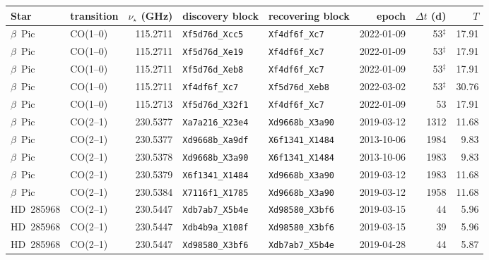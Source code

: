 \begin{tabular}{@{}llrllrrr@{}}
\hline
Star & transition & $\nu_\star$ (GHz) & discovery block & recovering block & epoch & $\Delta t$ (d) & $T$ \\
\hline
$\beta$~Pic & CO(1--0) & 115.2711 & \texttt{Xf5d76d\_Xcc5} & \texttt{Xf4df6f\_Xc7} & 2022-01-09 & 53$^\ddagger$ & 17.91 \\
$\beta$~Pic & CO(1--0) & 115.2711 & \texttt{Xf5d76d\_Xe19} & \texttt{Xf4df6f\_Xc7} & 2022-01-09 & 53$^\ddagger$ & 17.91 \\
$\beta$~Pic & CO(1--0) & 115.2711 & \texttt{Xf5d76d\_Xeb8} & \texttt{Xf4df6f\_Xc7} & 2022-01-09 & 53$^\ddagger$ & 17.91 \\
$\beta$~Pic & CO(1--0) & 115.2711 & \texttt{Xf4df6f\_Xc7} & \texttt{Xf5d76d\_Xeb8} & 2022-03-02 & 53$^\ddagger$ & 30.76 \\
$\beta$~Pic & CO(1--0) & 115.2713 & \texttt{Xf5d76d\_X32f1} & \texttt{Xf4df6f\_Xc7} & 2022-01-09 & 53 & 17.91 \\
$\beta$~Pic & CO(2--1) & 230.5377 & \texttt{Xa7a216\_X23e4} & \texttt{Xd9668b\_X3a90} & 2019-03-12 & 1312 & 11.68 \\
$\beta$~Pic & CO(2--1) & 230.5377 & \texttt{Xd9668b\_Xa9df} & \texttt{X6f1341\_X1484} & 2013-10-06 & 1984 & 9.83 \\
$\beta$~Pic & CO(2--1) & 230.5378 & \texttt{Xd9668b\_X3a90} & \texttt{X6f1341\_X1484} & 2013-10-06 & 1983 & 9.83 \\
$\beta$~Pic & CO(2--1) & 230.5379 & \texttt{X6f1341\_X1484} & \texttt{Xd9668b\_X3a90} & 2019-03-12 & 1983 & 11.68 \\
$\beta$~Pic & CO(2--1) & 230.5384 & \texttt{X7116f1\_X1785} & \texttt{Xd9668b\_X3a90} & 2019-03-12 & 1958 & 11.68 \\
HD~285968 & CO(2--1) & 230.5447 & \texttt{Xdb7ab7\_X5b4e} & \texttt{Xd98580\_X3bf6} & 2019-03-15 & 44 & 5.96 \\
HD~285968 & CO(2--1) & 230.5447 & \texttt{Xdb4b9a\_X108f} & \texttt{Xd98580\_X3bf6} & 2019-03-15 & 39 & 5.96 \\
HD~285968 & CO(2--1) & 230.5447 & \texttt{Xd98580\_X3bf6} & \texttt{Xdb7ab7\_X5b4e} & 2019-04-28 & 44 & 5.87 \\
\hline
\end{tabular}
